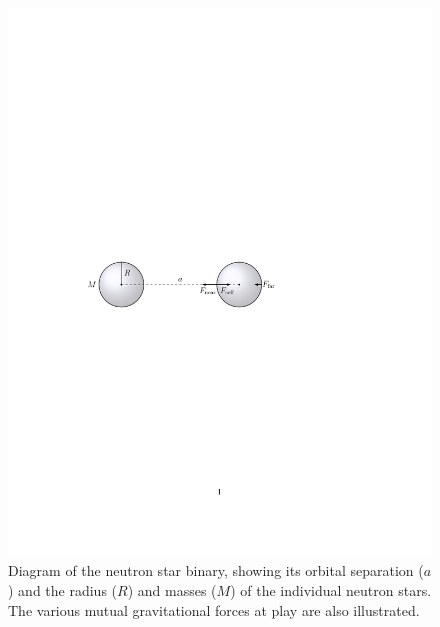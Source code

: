\documentclass[11pt]{article}
\begin{document}
\begin{figure}[!h]
\begin{mdframed}
\centering
\includegraphics{stable_orbit/binary_diagram.pdf}
\caption{\label{fig:binary_diagram}Diagram of the neutron star binary, showing its orbital separation ($a$) and the radius ($R$) and masses ($M$) of the individual neutron stars. The various mutual gravitational forces at play are also illustrated.}
\end{mdframed}
\end{figure}
\end{document}
